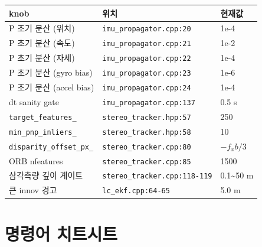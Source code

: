 \documentclass[11pt,a4paper,oneside]{report}
\begin{document}
\begin{center}\small
\begin{tabular}{lll}
\toprule
knob & 위치 & 현재값 \\
\midrule
P 초기 분산 (위치) & \texttt{imu\_propagator.cpp:20} & 1e-4 \\
P 초기 분산 (속도) & \texttt{imu\_propagator.cpp:21} & 1e-2 \\
P 초기 분산 (자세) & \texttt{imu\_propagator.cpp:22} & 1e-4 \\
P 초기 분산 (gyro bias) & \texttt{imu\_propagator.cpp:23} & 1e-6 \\
P 초기 분산 (accel bias) & \texttt{imu\_propagator.cpp:24} & 1e-4 \\
dt sanity gate & \texttt{imu\_propagator.cpp:137} & 0.5 s \\
\texttt{target\_features\_} & \texttt{stereo\_tracker.hpp:57} & 250 \\
\texttt{min\_pnp\_inliers\_} & \texttt{stereo\_tracker.hpp:58} & 10 \\
\texttt{disparity\_offset\_px\_} & \texttt{stereo\_tracker.cpp:80} & \(-f_x b/3\) \\
ORB nfeatures & \texttt{stereo\_tracker.cpp:85} & 1500 \\
삼각측량 깊이 게이트 & \texttt{stereo\_tracker.cpp:118-119} & 0.1\textasciitilde{}50 m \\
큰 innov 경고 & \texttt{lc\_ekf.cpp:64-65} & 5.0 m \\
\bottomrule
\end{tabular}
\end{center}


\appendix
\chapter{명령어 치트시트}
\end{document}
